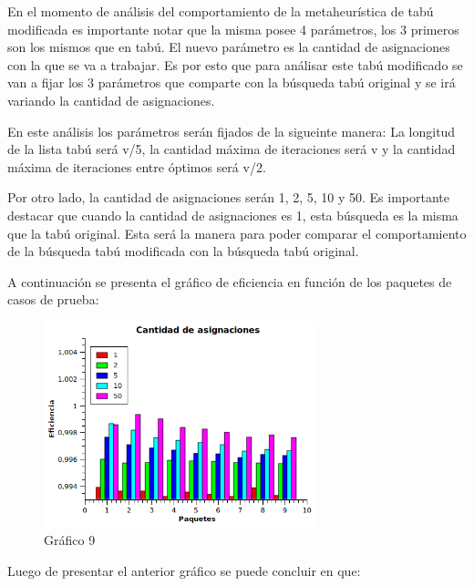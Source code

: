 \documentclass[a4paper,10pt]{article}
\begin{document}
En el momento de an\'alisis del comportamiento de la metaheur\'istica de tab\'u modificada es importante notar que la misma posee 4 par\'ametros, los 3 primeros son los mismos que en tab\'u. El nuevo par\'ametro es la cantidad de asignaciones con la que se va a trabajar. Es por esto que para an\'alisar este tab\'u modificado se van a fijar los 3 par\'ametros que comparte con la b\'usqueda tab\'u original y se ir\'a variando la cantidad de asignaciones. 

En este an\'alisis los par\'ametros ser\'an fijados de la sigueinte manera: La longitud de la lista tab\'u ser\'a v/5, la cantidad m\'axima de iteraciones ser\'a v y la cantidad m\'axima de iteraciones entre \'optimos ser\'a v/2.

Por otro lado, la cantidad de asignaciones ser\'an 1, 2, 5, 10 y 50. Es importante destacar que cuando la cantidad de asignaciones es 1, esta b\'usqueda es la misma que la tab\'u original. Esta ser\'a la manera para poder comparar el comportamiento de la b\'usqueda tab\'u modificada con la b\'usqueda tab\'u original.


A continuaci\'on se presenta el gr\'afico de eficiencia en funci\'on de los paquetes de casos de prueba:



\begin{figure}[H]
\centering
\includegraphics[width=0.7\textwidth]{graficos/combo2.png} 
\caption{Gráfico 9}
\end{figure}


Luego de presentar el anterior gr\'afico se puede concluir en que:
\end{document}
